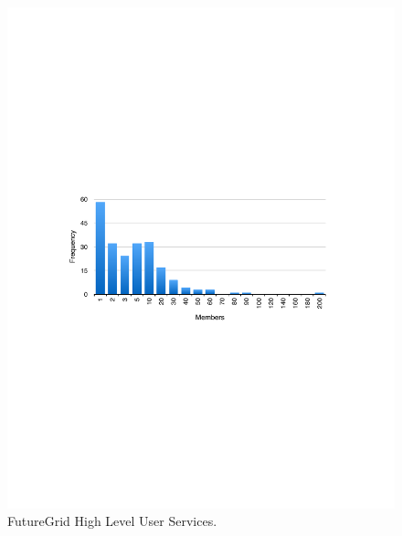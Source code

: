\documentclass{article}
\begin{document}
\begin{figure}[htb]
  \caption{FutureGrid High Level User Services.}
  \centering
    \includegraphics[width=1.0\textwidth]{images/project-frequency.pdf}
\end{figure}
\end{document}

